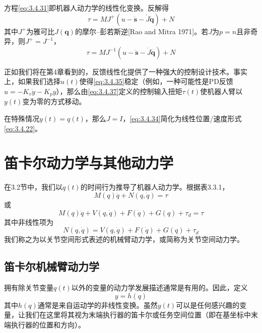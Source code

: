 \documentclass[12pt,a4paper]{ctexart}
\begin{document}
方程\eqref{eq:3.4.31}即机器人动力学的线性化变换。反解得
\begin{equation}\label{eq:3.4.36}
\tau = M J^+ (u - \ddot{\bm{s}} - \dot{J}\dot{\bm{q}}) + N
\end{equation}
其中$J^+$为雅可比$J(\bm{q})$的摩尔–彭若斯逆[Rao and Mitra 1971]。若$J$为$p=n$且非奇异，则$J^+=J^{-1}$，
\begin{equation}\label{eq:3.4.37}
\tau = M J^{-1} (u - \ddot{\bm{s}} - \dot{J}\dot{\bm{q}}) + N
\end{equation}

正如我们将在第4章看到的，反馈线性化提供了一种强大的控制设计技术。事实上，如果我们选择$u(t)$使得\eqref{eq:3.4.35}稳定（例如，一种可能性是PD反馈$u = -K_v \dot{y} - K_p y$），那么由\eqref{eq:3.4.37}定义的控制输入扭矩$\tau(t)$使机器人臂以$y(t)$变为零的方式移动。

在特殊情况$y(t) = q(t)$，那么$J = I$，\eqref{eq:3.4.34}简化为线性位置/速度形式\eqref{eq:3.4.22}。

\section{笛卡尔动力学与其他动力学}

在3.2节中，我们以$q(t)$的时间行为推导了机器人动力学。根据表3.3.1，
\begin{equation}\label{eq:3.5.2}
M(q)\ddot{q} + N(q,\dot{q}) = \tau
\end{equation}
或
\begin{equation}\label{eq:3.5.2a}
M(q)\ddot{q} + V(q,\dot{q}) + F(\dot{q}) + G(q) + \tau_d = \tau
\end{equation}
其中非线性项为
\begin{equation}\label{eq:3.5.3}
N(q,\dot{q}) = V(q,\dot{q}) + F(\dot{q}) + G(q) + \tau_d
\end{equation}
我们称之为以关节空间形式表述的机械臂动力学，或简称为关节空间动力学。

\subsection{笛卡尔机械臂动力学}

拥有除关节变量$q(t)$以外的变量的动力学发展描述通常是有用的。因此，定义
\begin{equation}\label{eq:3.5.4}
y = h(q)
\end{equation}
其中$h(q)$通常是来自运动学的非线性变换。虽然$y(t)$可以是任何感兴趣的变量，让我们在这里将其视为末端执行器的笛卡尔或任务空间位置（即在基坐标中末端执行器的位置和方向）。
\end{document}
